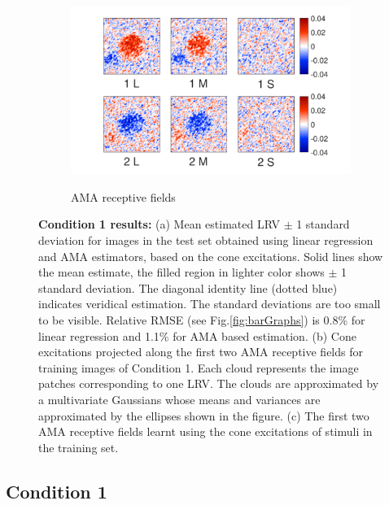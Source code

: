 \documentclass{jov}
\begin{document}
\begin{figure}
\begin{subfigure}[b]{0.26 \textwidth}
        \label{fig:case1RFResponse}
    \end{subfigure}
    \begin{subfigure}[b]{0.4 \textwidth}
	\caption{AMA receptive fields}
	\includegraphics[width=1.0\textwidth, trim={0.2cm -0.cm 0 0.3cm}]{../FiguresDraft5/Figure10/Figure10_c.pdf}
	\label{fig:case1RFs}
    \end{subfigure}   
    \caption{{\bf Condition 1 results:} (a) Mean estimated LRV $\pm$ 1 standard deviation for images in the test set obtained using linear regression and AMA estimators, based on the cone excitations. Solid lines show the mean estimate, the filled region in lighter color shows $\pm$ 1 standard deviation. The diagonal identity line (dotted blue) indicates veridical estimation. The standard deviations are too small to be visible. Relative RMSE (see Fig.\ref{fig:barGraphs}) is 0.8\% for linear regression and 1.1\%  for AMA based estimation. (b) Cone excitations projected along the first two AMA receptive fields for training images of Condition 1. Each cloud represents the image patches corresponding to one LRV. The clouds are approximated by a multivariate Gaussians whose means and variances are approximated by the ellipses shown in the figure. (c) The first two AMA receptive fields learnt using the cone excitations of stimuli in the training set.}
\label{fig:Condition1}
\end{figure}

\subsection{Condition 1}
\end{document}
